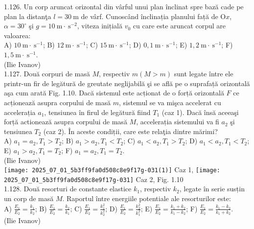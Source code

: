 1.126. Un corp aruncat orizontal din vârful unui plan înclinat spre bază cade pe plan la distanţa $l=30 \mathrm{~m}$ de vârf. Cunoscând înclinația planului față de $\mathrm{O} x$, $\alpha=30^{\circ}$ şi $g=10 \mathrm{~m} \cdot \mathrm{~s}^{-2}$, viteza inițială $v_{0}$ cu care este aruncat corpul are valoarea:\\ A) $10 \mathrm{~m} \cdot \mathrm{~s}^{-1}$; B) $12 \mathrm{~m} \cdot \mathrm{~s}^{-1}$; C) $15 \mathrm{~m} \cdot \mathrm{~s}^{-1}$; D) $0,1 \mathrm{~m} \cdot \mathrm{~s}^{-1}$; E) $1,2 \mathrm{~m} \cdot \mathrm{~s}^{-1}$; F) $1,5 \mathrm{~m} \cdot \mathrm{~s}^{-1}$.\\ (Ilie Ivanov)\\

1.127. Două corpuri de masă $M$, respectiv $m (M>m)$ sunt legate între ele printr-un fir de legătură de greutate neglijabilă şi se află pe o suprafață orizontală aşa cum arată Fig. 1.10. Dacă sistemul este acționat de o forță orizontală $F$ ce acționează asupra corpului de masă $m$, sistemul se va mişca accelerat cu accelerația $a_{1}$, tensiunea în firul de legătură fiind $T_{1}$ (caz 1). Dacă însă aceeaşi forță actionează asupra corpului de masă $M$, accelerația sistemului va fi $a_{2}$ şi tensiunea $T_{2}$ (caz 2). În aceste condiții, care este relaţia dintre mărimi?\\ A) $a_{1}=a_{2}, T_{1}>T_{2}$; B) $a_{1}>a_{2}, T_{1}<T_{2}$; C) $a_{1}<a_{2}, T_{1}>T_{2}$; D) $a_{1}<a_{2}, T_{1}<T_{2}$; E) $a_{1}>a_{2}, T_{1}=T_{2}$; F) $a_{1}=a_{2}, T_{1}=T_{2}$.\\ (Ilie Ivanov)\\ \texttt{[image: 2025\_07\_01\_5b3ff9fa0d508c8e9f17g-031(1)]} Caz 1, \texttt{[image: 2025\_07\_01\_5b3ff9fa0d508c8e9f17g-031]} Caz 2, Fig. 1.10\\

1.128. Două resorturi de constante elastice $k_{1}$, respectiv $k_{2}$, legate în serie susțin un corp de masă $M$. Raportul între energiile potentiale ale resorturilor este:\\ A) $\frac{E_{1}}{E_{2}}=\frac{k_{1}}{k_{2}}$; B) $\frac{E_{1}}{E_{2}}=\frac{k_{2}}{k_{1}}$; C) $\frac{E_{1}}{E_{2}}=\frac{k_{1}^{2}}{k_{2}^{2}}$; D) $\frac{E_{1}}{E_{2}}=\frac{k_{2}^{2}}{k_{1}^{2}}$; E) $\frac{E_{1}}{E_{2}}=\frac{k_{1}+k_{2}}{k_{1}-k_{2}}$; F) $\frac{E_{1}}{E_{2}}=\frac{k_{1}-k_{2}}{k_{1}+k_{2}}$.\\ (Ilie Ivanov)\\

